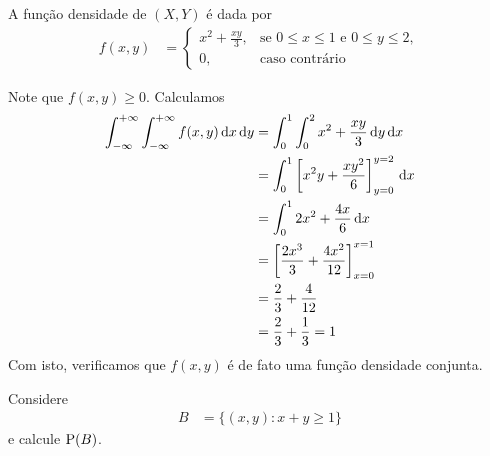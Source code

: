 \begin{example}\label{exp:ch03-fdp}
    A função densidade de $(X, Y)$ é dada por
    \begin{align*}
        f(x, y) &= \begin{cases}
            x^2 + \frac{xy}{3}, 
                &\text{se } 0 \leq x \leq 1 \text{ e } 0 \leq y \leq 2, \\
            0, &\text{caso contrário}
        \end{cases}
    \end{align*}

    Note que $f(x, y) \ge 0$.
    Calculamos
    \begin{align*}
        \int_{-\infty}^{+\infty} \int_{-\infty}^{+\infty}
            f(x, y) \,\mathrm{d} x \,\mathrm{d} y
        &= \int_0^1 \int_0^2 x^2 + \frac{xy}{3} \,\mathrm{d} y \,\mathrm{d} x \\
        &= \int_0^1 \left[
            x^2y + \frac{xy^2}{6}
        \right]_{y=0}^{y=2} \,\mathrm{d} x \\
        &= \int_0^1 2x^2 + \frac{4x}{6} \,\mathrm{d} x \\
        &= \left[\frac{2x^3}{3} + \frac{4x^2}{12}\right]_{x=0}^{x=1} \\
        &= \frac{2}{3} + \frac{4}{12} \\
        &= \frac{2}{3} + \frac{1}{3} = 1
    \end{align*}
    Com isto, verificamos que $f(x, y)$ é de fato uma
    função densidade conjunta.

    Considere
    \begin{align*}
        B &= \{(x,y) : x + y \ge 1\}
    \end{align*}
    e calcule $\operatorname{P}(B)$.

    \begin{center}
\end{center}
\end{example}
